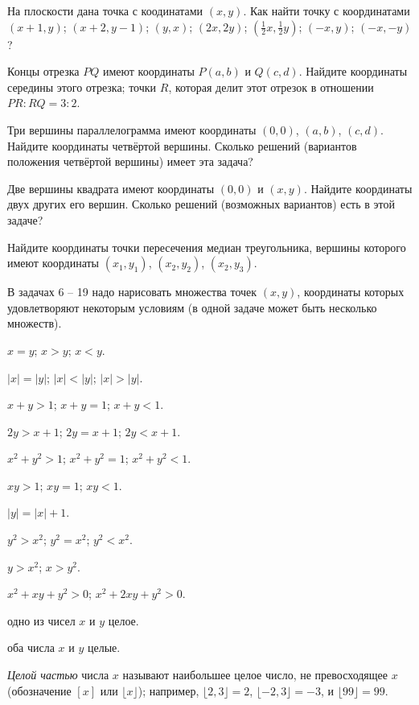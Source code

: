 \documentclass[a4paper,11pt]{article}
\begin{document}


На плоскости дана точка с коодинатами $(x,y)$. Как найти точку с координатами
 $(x+1,y)$;
 $(x+2,y-1)$;
 $(y,x)$;
 $(2x,2y)$;
 $(\frac{1}{2}x,\frac{1}{2}y)$;
 $(-x,y)$;
 $(-x,-y)$?

Концы отрезка $PQ$ имеют координаты $P(a,b)$ и $Q(c,d)$. Найдите координаты
 середины этого отрезка;
 точки $R$, которая делит этот отрезок в отношении $PR:RQ=3:2$.


Три вершины параллелограмма имеют координаты $(0,0)$, $(a,b)$, $(c,d)$.  Найдите координаты четвёртой вершины. Сколько решений (вариантов положения четвёртой вершины) имеет эта задача?

Две вершины квадрата имеют координаты $(0,0)$ и $(x,y)$. Найдите координаты двух других его вершин. Сколько решений (возможных вариантов) есть в этой задаче?

Найдите координаты точки пересечения медиан треугольника, вершины которого имеют координаты $(x_1,y_1)$, $(x_2,y_2)$, $(x_2,y_3)$.


В задачах 6 -- 19 надо нарисовать множества точек $(x,y)$, координаты которых удовлетворяют некоторым условиям (в одной задаче может быть несколько множеств).

$x=y$; $x>y$; $x<y$.

$|x|=|y|$; $|x|<|y|$; $|x|>|y|$.

$x+y>1$; $x+y=1$; $x+y<1$.

$2y>x+1$; $2y=x+1$; $2y<x+1$.

$x^2+y^2>1$; $x^2+y^2=1$; $x^2+y^2<1$.

$xy>1$; $xy=1$; $xy<1$.

$|y|=|x|+1$.

$y^2>x^2$; $y^2=x^2$; $y^2<x^2$.

$y>x^2$; $x>y^2$.

$x^2+xy+y^2>0$; $x^2+2xy+y^2>0$.

одно из чисел $x$ и $y$ целое.

оба числа $x$ и $y$ целые.


\emph{Целой частью} числа $x$ называют наибольшее целое число, не превосходящее $x$ (обозначение $[x]$ или $\lfloor x\rfloor$); например, $\lfloor 2{,}3\rfloor =2$, $\lfloor -2{,}3\rfloor=-3$, и $\lfloor 99\rfloor=99$.
\end{document}
